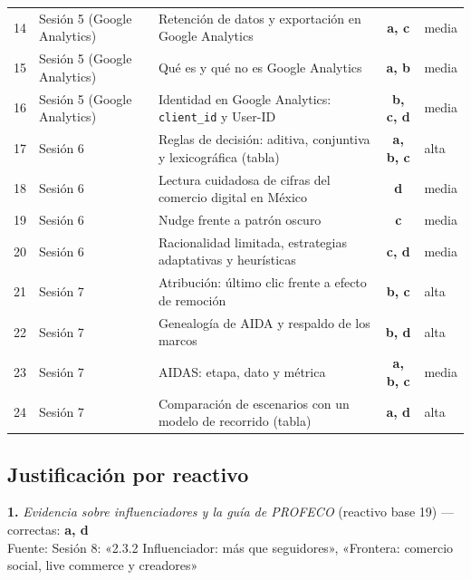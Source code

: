 \documentclass[10pt,letterpaper]{article}
\begin{document}
\begin{center}
\begin{tabular}{@{}rllcl@{}}
14 & Sesión 5 (Google Analytics) & Retención de datos y exportación en Google Analytics & \textbf{a, c} & media\\
15 & Sesión 5 (Google Analytics) & Qué es y qué no es Google Analytics & \textbf{a, b} & media\\
16 & Sesión 5 (Google Analytics) & Identidad en Google Analytics: \texttt{client\_id} y User-ID & \textbf{b, c, d} & media\\
17 & Sesión 6 & Reglas de decisión: aditiva, conjuntiva y lexicográfica (tabla) & \textbf{a, b, c} & alta\\
18 & Sesión 6 & Lectura cuidadosa de cifras del comercio digital en México & \textbf{d} & media\\
19 & Sesión 6 & Nudge frente a patrón oscuro & \textbf{c} & media\\
20 & Sesión 6 & Racionalidad limitada, estrategias adaptativas y heurísticas & \textbf{c, d} & media\\
21 & Sesión 7 & Atribución: último clic frente a efecto de remoción & \textbf{b, c} & alta\\
22 & Sesión 7 & Genealogía de AIDA y respaldo de los marcos & \textbf{b, d} & alta\\
23 & Sesión 7 & AIDAS: etapa, dato y métrica & \textbf{a, b, c} & media\\
24 & Sesión 7 & Comparación de escenarios con un modelo de recorrido (tabla) & \textbf{a, d} & alta\\
\bottomrule\end{tabular}\end{center}\subsection*{Justificación por reactivo}
\vspace{3pt}\noindent\textbf{1.} \textit{Evidencia sobre influenciadores y la guía de PROFECO} (reactivo base 19) — correctas: \textbf{a, d}\\[-1pt]
{\scriptsize Fuente: Sesión 8: «2.3.2 Influenciador: más que seguidores», «Frontera: comercio social, live commerce y creadores»}
\end{document}
